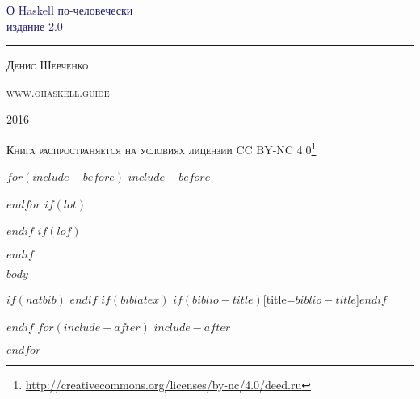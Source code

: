 \documentclass[$if(fontsize)$$fontsize$,$endif$$if(lang)$$babel-lang$,$endif$$if(papersize)$$papersize$,$endif$$for(classoption)$$classoption$$sep$,$endfor$]{book}
\date{$date$}
\renewcommand{\href}[2]{#2\footnote{\url{#1}}}
\newcommand*{\ohaskelltitle}{\begingroup
\newlength{\drop} %
\drop=0.1\textheight %

\vspace{\drop} %
\centering %
\textcolor{MidnightBlue}{ %
{\Huge О Haskell по-человечески}\\[0.5\baselineskip] %
\vspace{15pt}
{\Large издание 2.0}
} %

\vspace{0.25\drop}
\rule{0.3\textwidth}{0.4pt}\par
\vspace{\drop}

{\large \textsc{Денис Шевченко}}\par

\vfill
{\large \textsc{www.ohaskell.guide}}\par
{\Large \textsc{2016}}\par
\endgroup}
\newcommand*{\ohaskelllicense}{\begingroup
\vspace*{\fill}
\centering
{\large \textsc{Книга распространяется на условиях лицензии \href{http://creativecommons.org/licenses/by-nc/4.0/deed.ru}{CC BY-NC 4.0}}}\par
\vspace*{\fill}
\endgroup}
\begin{document}
\pagestyle{empty}
\ohaskelltitle
\newpage
\pagestyle{empty}
\ohaskelllicense

$for(include-before)$
$include-before$

$endfor$
{
\hypersetup{linkcolor=black}
\setcounter{tocdepth}{1}
\pagestyle{empty}
\tableofcontents
\thispagestyle{empty}
\clearpage
}
$if(lot)$
\listoftables
$endif$
$if(lof)$
\listoffigures
$endif$

\pagestyle{fancy}
\fancyhf{}
\lhead{\nouppercase{\rightmark}}
\rhead{\nouppercase{\leftmark}}
\fancyfoot[C]{\thepage}
$body$

$if(natbib)$
$endif$
$if(biblatex)$
\printbibliography$if(biblio-title)$[title=$biblio-title$]$endif$

$endif$
$for(include-after)$
$include-after$

$endfor$
\end{document}
